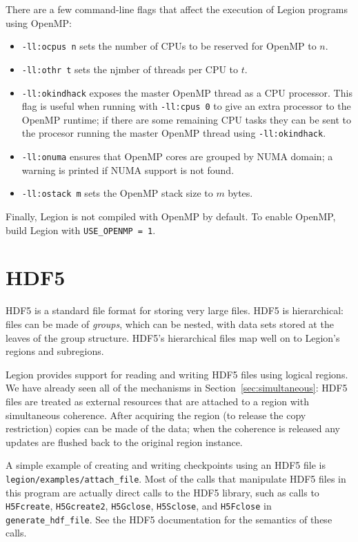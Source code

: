 There are a few command-line flags that affect the execution of Legion programs using OpenMP:
\begin{itemize}

\item {\tt -ll:ocpus n} sets the number of CPUs to be reserved for OpenMP to $n$.
\item {\tt -ll:othr t} sets the njmber of threads per CPU to $t$.
\item {\tt -ll:okindhack} exposes the master OpenMP thread as a CPU processor. This flag is useful when running with {\tt -ll:cpus 0} to give an extra processor to the OpenMP runtime; if there are some remaining CPU tasks they can be sent to the
    procesor running the master OpenMP thread using {\tt -ll:okindhack}.
\item {\tt -ll:onuma} ensures that OpenMP cores are grouped by NUMA domain; a warning is printed if NUMA support is not found.
\item {\tt -ll:ostack m} sets the OpenMP stack size to $m$ bytes.
\end{itemize}

Finally, Legion is not compiled with OpenMP by default.  To enable OpenMP, build Legion with {\tt USE\_OPENMP = 1}.
  

\section{HDF5}
\label{sechdf5}

HDF5 is a standard file format for storing very large files.  HDF5 is hierarchical: files can be made of {\em groups}, which can
be nested, with data sets stored at the leaves of the group structure.  HDF5's hierarchical files map well on to Legion's
regions and subregions.

Legion provides support for reading and writing HDF5 files using logical regions. We have already seen all of the mechanisms in 
Section~\ref{sec:simultaneous}: HDF5 files are treated as external resources that are attached to a region with simultaneous coherence.  After acquiring
the region (to release the copy restriction) copies can be made of the data; when the coherence is released any updates are
flushed back to the original region instance.

A simple example of creating and writing checkpoints using an HDF5 file is {\tt legion/examples/attach\_file}.  Most
of the calls that manipulate HDF5 files in this program are actually direct calls to the HDF5 library, such as calls to
{\tt H5Fcreate}, {\tt H5Gcreate2}, {\tt H5Gclose}, {\tt H5Sclose}, and {\tt H5Fclose} in {\tt generate\_hdf\_file}.  See the
HDF5 documentation for the semantics of these calls.

